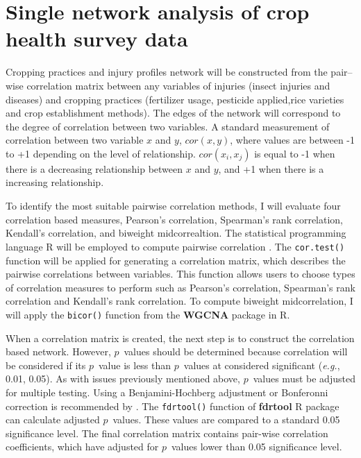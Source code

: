 \section*{Single network analysis of crop health survey data}

Cropping practices and injury profiles network will be constructed from the pair--wise correlation matrix between any variables of injuries (insect injuries and diseases) and cropping practices (fertilizer usage, pesticide applied,rice varieties and crop establishment methods). The edges of the network will correspond to the degree of correlation between two variables. A standard measurement of correlation between two variable $x$ and $y$, $cor(x,y)$, where values are  between -1 to +1 depending on the level of relationship. $cor(x_{i}, x_{j})$ is equal to -1 when there is a decreasing relationship between $x$ and $y$, and +1 when there is a increasing relationship.

To identify the most suitable pairwise correlation methods, I will evaluate four correlation based measures, Pearson's correlation, Spearman's rank correlation, Kendall's correlation, and biweight midcorrealtion. The statistical programming language \textsf{R} will be employed to compute pairwise correlation \citep{R:2014a}. The \texttt{cor.test()} function will be applied for generating a correlation matrix, which describes the pairwise correlations between variables. This function allows users to choose types of correlation measures to perform such as Pearson's correlation, Spearman's rank correlation and Kendall's rank correlation. To compute biweight midcorrelation, I will apply the \texttt{bicor()} function from the \textbf{WGCNA} package \citep{Langfelder:2008bd} in \textsf{R}. 

When a correlation matrix is created, the next step is to construct the correlation based network. However, $p$~values should be determined because correlation will be considered if    its $p$~value is less than $p$~values at considered significant (\textit{e.g.}, 0.01, 0.05). As with issues previously mentioned above, $p$~values must be adjusted for multiple testing. Using a Benjamini-Hochberg adjustment or Bonferonni correction is recommended by \citet{kolaczyk2014statistical}. The \texttt{fdrtool()} function of \textbf{fdrtool} R package can calculate adjusted $p$~values. These values are compared to a standard 0.05 significance level. The final correlation matrix contains pair-wise correlation coefficients, which have adjusted for $p$~values lower than 0.05 significance level.

